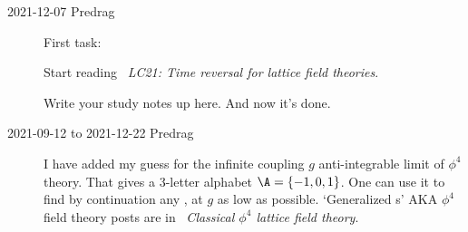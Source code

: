 \begin{description}
\item[2021-12-07 Predrag]
First task:

Start reading
~{\em LC21: Time reversal for lattice field theories}.

Write your study notes up here. And now it's done.

\item[2021-09-12 to 2021-12-22 Predrag]
I have added my guess  for the infinite coupling $g$
anti-integrable limit of $\phi^4$ theory. That gives a 3-letter
alphabet $\A=\{-1,0,1\}$. One can use it to find by
continuation any {\lattstate}, at $g$ as low as possible.
`Generalized {\HenonMap}s' AKA $\phi^4$ field theory posts are in
~{\em Classical {$\phi^4$} lattice field theory}.







\end{description}

\bigskip

\renewcommand{\ssp}{\ensuremath{x}}             %
\renewcommand{\Ssym}[1]{{\ensuremath{s_{#1}}}}    %
\renewcommand{\Refl}{\ensuremath{\sigma}}             %
\renewcommand{\shift}{\ensuremath{d}}                 %

\printbibliography[heading=subbibintoc,title={References}]

\ChapterEnd %
